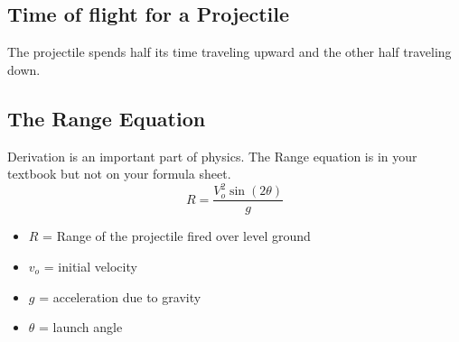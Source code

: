 \subsection{Time of flight for a Projectile}
The projectile spends half its time traveling upward and the other half traveling down.
	
\subsection{The Range Equation}
Derivation is an important part of physics. The Range equation is in your textbook but not on your formula sheet. \[R=\frac{V_o^2\sin(2\theta)}{g}\]
\begin{itemize}
	\item $R$ = Range of the projectile fired over level ground
	\item $v_o$ = initial velocity
	\item $g$ = acceleration due to gravity
	\item $\theta$ = launch angle
\end{itemize}